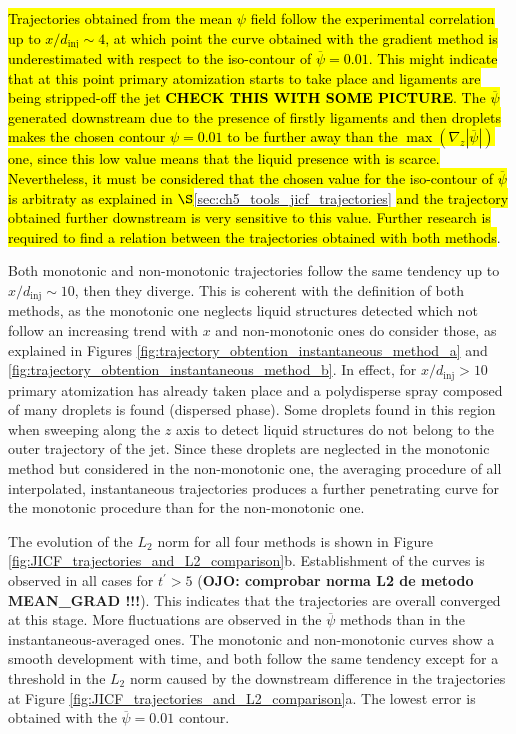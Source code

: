 \hl{Trajectories obtained from the mean $\psi$ field follow the experimental correlation up to $x/d_\mathrm{inj} \sim 4$, at which point the curve obtained with the gradient method is underestimated with respect to the iso-contour of $\overline{\psi} = 0.01$. This might indicate that at this point primary atomization starts to take place and ligaments are being stripped-off the jet \textbf{CHECK THIS WITH SOME PICTURE}. The $\overline{\psi}$ generated downstream due to the presence of firstly ligaments and then droplets makes the chosen contour $\psi = 0.01$ to be further away than the $\max \left( \nabla_z | \overline{\psi} | \right)$ one, since this low value means that the liquid presence with is scarce. Nevertheless, it must be considered that the chosen value for the iso-contour of $\overline{\psi}$ is arbitraty as explained in $\S$}\ref{sec:ch5_tools_jicf_trajectories} \hl{and the trajectory obtained further downstream is very sensitive to this value. Further research is required to find a relation between the trajectories obtained with both methods}.

Both monotonic and non-monotonic trajectories follow the same tendency up to $x/d_\mathrm{inj} \sim 10$, then they diverge. This is coherent with the definition of both methods, as the monotonic one neglects liquid structures detected which not follow an increasing trend with $x$ and non-monotonic ones do consider those, as explained in Figures \ref{fig:trajectory_obtention_instantaneous_method_a} and \ref{fig:trajectory_obtention_instantaneous_method_b}. In effect, for $x/d_\mathrm{inj} > 10$ primary atomization has already taken place and a polydisperse spray composed of many droplets is found (dispersed phase). Some droplets found in this region when sweeping along the $z$ axis to detect liquid structures do not belong to the outer trajectory of the jet. Since these droplets are neglected in the monotonic method but considered in the non-monotonic one, the averaging procedure of all interpolated, instantaneous trajectories produces a further penetrating curve for the monotonic procedure than for the non-monotonic one.

The evolution of the $L_2$ norm for all four methods is shown in Figure \ref{fig:JICF_trajectories_and_L2_comparison}b. Establishment of the curves is observed in all cases for $t^{\prime} > 5$ (\textbf{OJO: comprobar norma L2 de metodo MEAN\_GRAD !!!}). This indicates that the trajectories are overall converged at this stage. More fluctuations are observed in the $\overline{\psi}$ methods than in the instantaneous-averaged ones. The monotonic and non-monotonic curves show a smooth development with time, and both follow the same tendency except for a threshold in the $L_2$ norm caused by the downstream difference in the trajectories at Figure \ref{fig:JICF_trajectories_and_L2_comparison}a. The lowest error is obtained with the $\overline{\psi} = 0.01$ contour.



